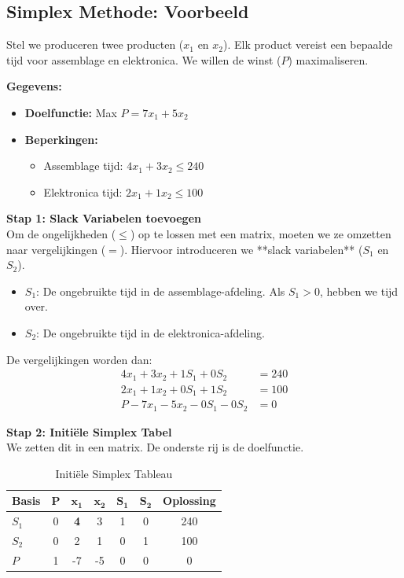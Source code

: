 \documentclass[a4paper,11pt]{article}
\begin{document}
\subsection{Simplex Methode: Voorbeeld}
Stel we produceren twee producten ($x_1$ en $x_2$). Elk product vereist een bepaalde tijd voor assemblage en elektronica. We willen de winst ($P$) maximaliseren.

\textbf{Gegevens:}
\begin{itemize}
    \item \textbf{Doelfunctie:} Max $P = 7x_1 + 5x_2$
    \item \textbf{Beperkingen:}
    \begin{itemize}
        \item Assemblage tijd: $4x_1 + 3x_2 \leq 240$
        \item Elektronica tijd: $2x_1 + 1x_2 \leq 100$
    \end{itemize}
\end{itemize}

\textbf{Stap 1: Slack Variabelen toevoegen} \\
Om de ongelijkheden ($\leq$) op te lossen met een matrix, moeten we ze omzetten naar vergelijkingen ($=$). Hiervoor introduceren we **slack variabelen** ($S_1$ en $S_2$).
\begin{itemize}
    \item $S_1$: De ongebruikte tijd in de assemblage-afdeling. Als $S_1 > 0$, hebben we tijd over.
    \item $S_2$: De ongebruikte tijd in de elektronica-afdeling.
\end{itemize}
De vergelijkingen worden dan:
\begin{align*}
    4x_1 + 3x_2 + 1S_1 + 0S_2 &= 240 \\
    2x_1 + 1x_2 + 0S_1 + 1S_2 &= 100 \\
    P - 7x_1 - 5x_2 - 0S_1 - 0S_2 &= 0
\end{align*}

\textbf{Stap 2: Initiële Simplex Tabel} \\
We zetten dit in een matrix. De onderste rij is de doelfunctie.

\begin{table}[H]
    \centering
    \caption{Initiële Simplex Tableau}
    \begin{tabular}{lcccccc}
        \toprule
        \textbf{Basis} & $\mathbf{P}$ & $\mathbf{x_1}$ & $\mathbf{x_2}$ & $\mathbf{S_1}$ & $\mathbf{S_2}$ & \textbf{Oplossing} \\
        \midrule
        $S_1$ & 0 & \textbf{4} & 3 & 1 & 0 & 240 \\
        $S_2$ & 0 & 2 & 1 & 0 & 1 & 100 \\
        \midrule
        $P$ & 1 & -7 & -5 & 0 & 0 & 0 \\
        \bottomrule
    \end{tabular}
\end{table}
\end{document}
